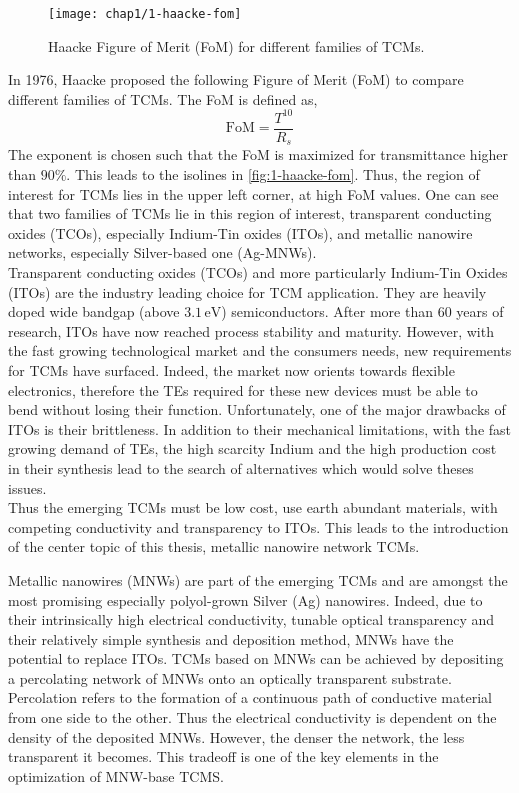     \begin{figure}[H]
        \centering
        \texttt{[image: chap1/1-haacke-fom]}
        \caption{Haacke Figure of Merit (FoM) for different families of TCMs.\cite{LagrangeLangleyGiustiJimenezBrechetBellet2015}}
        \label{fig:1-haacke-fom}
    \end{figure}
    In 1976, Haacke proposed the following Figure of Merit (FoM) to compare different families of TCMs. The FoM is defined as,
    \begin{equation*}
        \text{FoM} = \frac{T^{10}}{R_s}
    \end{equation*}
    The exponent is chosen such that the FoM is maximized for transmittance higher than $90\%$. This leads to the isolines in \autoref{fig:1-haacke-fom}. Thus, the region of interest for TCMs lies in the upper left corner, at high FoM values. One can see that two families of TCMs lie in this region of interest, transparent conducting oxides (TCOs), especially Indium-Tin oxides (ITOs), and metallic nanowire networks, especially Silver-based one (Ag-MNWs).\\
    Transparent conducting oxides (TCOs) and more particularly Indium-Tin Oxides (ITOs) are the industry leading choice for TCM application. They are heavily doped wide bandgap (above $3.1\,\text{eV}$) semiconductors. After more than 60 years of research, ITOs have now reached process stability and maturity. However, with the fast growing technological market and the consumers needs, new requirements for TCMs have surfaced. Indeed, the market now orients towards flexible electronics, therefore the TEs required for these new devices must be able to bend without losing their function. Unfortunately, one of the major drawbacks of ITOs is their brittleness. In addition to their mechanical limitations, with the fast growing demand of TEs, the high scarcity Indium and the high production cost in their synthesis lead to the search of alternatives which would solve theses issues.\\
    Thus the emerging TCMs must be low cost, use earth abundant materials, with competing conductivity and transparency to ITOs. This leads to the introduction of the center topic of this thesis, metallic nanowire network TCMs.

    Metallic nanowires (MNWs) are part of the emerging TCMs and are amongst the most promising especially polyol-grown Silver (Ag) nanowires. Indeed, due to their intrinsically high electrical conductivity, tunable optical transparency and their relatively simple synthesis and deposition method, MNWs have the potential to replace ITOs. TCMs based on MNWs can be achieved by depositing a percolating network of MNWs onto an optically transparent substrate. Percolation refers to the formation of a continuous path of conductive material from one side to the other. Thus the electrical conductivity is dependent on the density of the deposited MNWs. However, the denser the network, the less transparent it becomes. This tradeoff is one of the key elements in the optimization of MNW-base TCMS.
